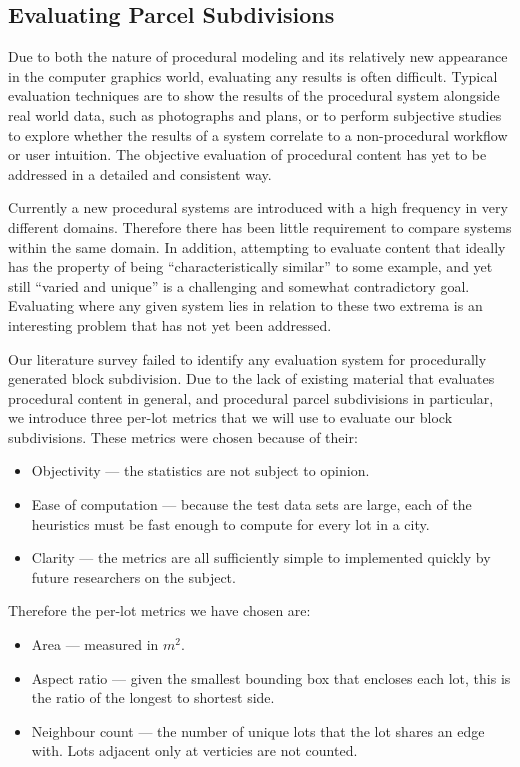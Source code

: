 \subsection{Evaluating Parcel Subdivisions}
\label{sec:evalParcels}


Due to both the nature of procedural modeling and its relatively new appearance in the computer graphics world, evaluating any results is often difficult. Typical evaluation techniques are to show the results of the procedural system alongside real world data, such as photographs and plans\cite{Mueller:2007:IBP, Stiny:1980:gop, Chen:2008:IPS}, or to perform subjective studies to explore whether the results of a system correlate to a non-procedural workflow or user intuition\cite{Lipp08, Yu11, Merrell11}. The objective evaluation of procedural content has yet to be addressed in a detailed and consistent way.

Currently a new procedural systems are introduced with a high frequency in very different domains. Therefore there has been little requirement to compare systems within the same domain. In addition, attempting to evaluate content that ideally has the property of being ``characteristically similar'' to some example, and yet still ``varied and unique'' is a challenging and somewhat contradictory goal. Evaluating where any given system lies in relation to these two extrema is an interesting problem that has not yet been addressed. 

Our literature survey failed to identify any evaluation system for procedurally generated block subdivision. Due to the lack of existing material that evaluates procedural content in general, and procedural parcel subdivisions in particular, we introduce three per-lot metrics that we will use to evaluate our block subdivisions. These metrics were chosen because of their:

\begin{itemize}
\item{Objectivity --- the statistics are not subject to opinion.}
\item{Ease of computation --- because the test data sets are large, each of the heuristics must be fast enough to compute for every lot in a city.}
\item{Clarity --- the metrics are all sufficiently simple to implemented quickly by future researchers on the subject.} 
\end{itemize}

Therefore the per-lot metrics we have chosen are:
\begin{itemize}
\item{Area --- measured in $m^2$.}
\item{Aspect ratio --- given the smallest bounding box that encloses each lot, this is the ratio of the longest to shortest side.}
\item{Neighbour count --- the number of unique lots that the lot shares an edge with. Lots adjacent only at verticies are not counted.} 
\end{itemize}
\kawt



